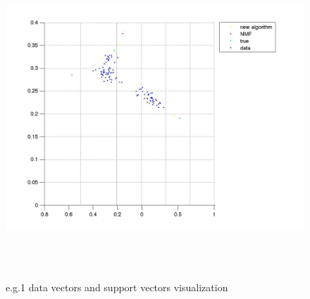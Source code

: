 \documentclass[14pt]{book}
\begin{document}
\par
\begin{figure}[ht!]

\includegraphics[width=150mm,height = 120mm]{eg1.jpg}
\caption{e.g.1 data vectors and support vectors visualization }
\label{overflow}
\end{figure}
\end{document}
